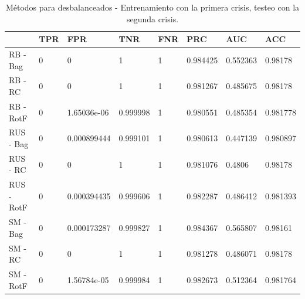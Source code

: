 \documentclass[a4paper,12pt,twoside,oldfontcommands]{memoir}
\begin{document}
\begin{table}\scriptsize
    \begin{center}
        \begin{tabular}{llllllll}
            \toprule
            {} & TPR &          FPR &       TNR & FNR &       PRC &       AUC &       ACC \\
            \midrule
            RB - Bag                &   0 &            0 &         1 &   1 &  0.984425 &  0.552363 &   0.98178 \\
            RB - RC       &   0 &            0 &         1 &   1 &  0.981267 &  0.485675 &   0.98178 \\
            RB - RotF        &   0 &  1.65036e-06 &  0.999998 &   1 &  0.980551 &  0.485354 &  0.981778 \\
            RUS - Bag          &   0 &  0.000899444 &  0.999101 &   1 &  0.980613 &  0.447139 &  0.980897 \\
            RUS - RC &   0 &            0 &         1 &   1 &  0.981076 &    0.4806 &   0.98178 \\
            RUS - RotF  &   0 &  0.000394435 &  0.999606 &   1 &  0.982287 &  0.486412 &  0.981393 \\
            SM - Bag                         &   0 &  0.000173287 &  0.999827 &   1 &  0.984367 &  0.565807 &   0.98161 \\
            SM - RC                &   0 &            0 &         1 &   1 &  0.981278 &  0.486071 &   0.98178 \\
            SM - RotF                 &   0 &  1.56784e-05 &  0.999984 &   1 &  0.982673 &  0.512364 &  0.981764 \\
            \bottomrule
        \end{tabular}
        \caption{Métodos para desbalanceados - Entrenamiento con la primera crisis, testeo con la segunda crisis.}
        \label{tab:crisis1}
    \end{center}
\end{table}
\end{document}
